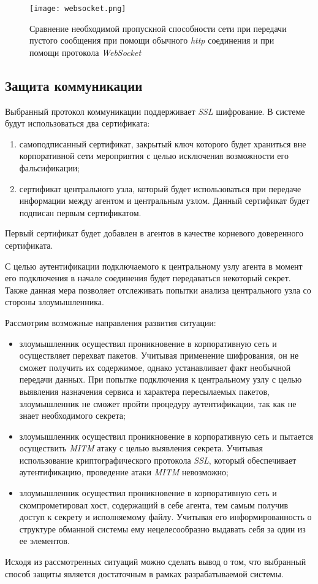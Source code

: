 \begin{figure}[ht]
\centering
	\texttt{[image: websocket.png]}  
	\caption{ Сравнение необходимой пропускной способности сети при передачи пустого сообщения при
помощи обычного \textit{http} соединения и при помощи протокола \textit{WebSocket}}
	\label{fig:websocket_http_compare}
\end{figure}

\subsection{Защита коммуникации}

Выбранный протокол коммуникации поддерживает \textit{SSL} шифрование. В системе будут использоваться два сертификата:
\begin{enumerate}
\item самоподписанный сертификат, закрытый ключ которого будет храниться вне корпоративной сети мероприятия с целью исключения возможности его фальсификации;
\item сертификат центрального узла, который будет использоваться при передаче информации между агентом и центральным узлом. Данный сертификат будет подписан первым сертификатом.
\end{enumerate}

Первый сертификат будет добавлен в агентов в качестве корневого доверенного сертификата.

С целью аутентификации подключаемого к центральному узлу агента   в момент его подключения в начале соединения будет передаваться некоторый секрет. Также данная мера позволяет отслеживать попытки анализа центрального узла со стороны злоумышленника.

Рассмотрим возможные направления развития ситуации:
\begin{itemize}
\item злоумышленник осуществил проникновение в корпоративную сеть и осуществляет перехват пакетов. Учитывая применение шифрования, он не сможет получить их содержимое, однако устанавливает факт необычной передачи данных. При попытке подключения к центральному узлу с целью выявления назначения сервиса и характера пересылаемых пакетов, злоумышленник не сможет пройти процедуру аутентификации, так как не знает необходимого секрета;
\item злоумышленник осуществил проникновение в корпоративную сеть и пытается осуществить \textit{MITM} атаку с целью выявления секрета. Учитывая использование криптографического протокола \textit{SSL}, который обеспечивает аутентификацию, проведение атаки \textit{MITM} невозможно;
\item злоумышленник осуществил проникновение в корпоративную сеть и скомпрометировал хост, содержащий в себе агента, тем самым получив доступ к секрету и исполняемому файлу. Учитывая его информированность о структуре обманной системы ему нецелесообразно выдавать себя за один из ее элементов.
\end{itemize}

Исходя из рассмотренных ситуаций можно сделать вывод о том, что выбранный способ защиты является достаточным в рамках разрабатываемой системы.